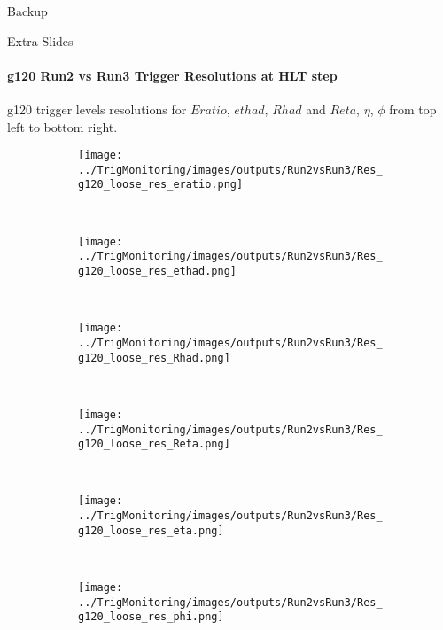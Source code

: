 \documentclass[aspectratio=1610,8pt]{beamer}					%
\begin{document}
\begin{frame}{Backup}
\end{frame}
\begin{frame}{Extra Slides}
\framesubtitle{g120 Run2 vs Run3 Trigger Resolutions at HLT step}
    g120 trigger levels resolutions for $Eratio$, $ethad$, $Rhad$ and $Reta$, $\eta$, $\phi$ from top left to bottom right.
    \begin{figure}[h!]
        \centering
        \begin{subfigure}[b]{.3\textwidth}
            \centering
            \texttt{[image: ../TrigMonitoring/images/outputs/Run2vsRun3/Res\_g120\_loose\_res\_eratio.png]}
            \caption{~}
        \end{subfigure}
        \begin{subfigure}[b]{.3\textwidth}
            \centering
            \texttt{[image: ../TrigMonitoring/images/outputs/Run2vsRun3/Res\_g120\_loose\_res\_ethad.png]}
            \caption{~}
        \end{subfigure}
        \begin{subfigure}[b]{.3\textwidth}
            \centering
            \texttt{[image: ../TrigMonitoring/images/outputs/Run2vsRun3/Res\_g120\_loose\_res\_Rhad.png]}
            \caption{~}
        \end{subfigure}
        \begin{subfigure}[b]{.3\textwidth}
            \centering
            \texttt{[image: ../TrigMonitoring/images/outputs/Run2vsRun3/Res\_g120\_loose\_res\_Reta.png]}
            \caption{~}
        \end{subfigure}
        \begin{subfigure}[b]{.3\textwidth}
            \centering
            \texttt{[image: ../TrigMonitoring/images/outputs/Run2vsRun3/Res\_g120\_loose\_res\_eta.png]}
            \caption{~}
        \end{subfigure}
        \begin{subfigure}[b]{.3\textwidth}
            \centering
            \texttt{[image: ../TrigMonitoring/images/outputs/Run2vsRun3/Res\_g120\_loose\_res\_phi.png]}
            \caption{~}
        \end{subfigure}
    \end{figure}
\end{frame}
\end{document}
